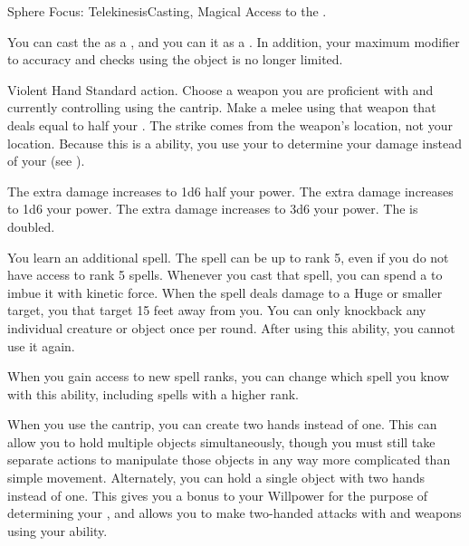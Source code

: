   \begin{magicalfeat}{Sphere Focus: Telekinesis}{Casting, Magical}
    \featpre Access to the  .

     You can cast the   as a , and you can  it as a .
    In addition, your maximum modifier to accuracy and checks using the object is no longer limited.

    \begin{magicalactiveability}{Violent Hand}
      \abilityusagetime Standard action.
      \rankline
      Choose a weapon you are proficient with and currently controlling using the  cantrip.
      Make a melee  using that weapon that deals  equal to half your .
      The strike comes from the weapon's location, not your location.
      Because this is a \magical ability, you use your  to determine your damage instead of your  (see ).

      \rankline
       The extra damage increases to 1d6 \add half your power.
       The extra damage increases to 1d6 \add your power.
       The extra damage increases to 3d6 \add your power.
       The  is doubled.
    \end{magicalactiveability}

     You learn an additional spell.
    The spell can be up to rank 5, even if you do not have access to rank 5 spells.
    Whenever you cast that spell, you can spend a  to  imbue it with kinetic force.
    When the spell deals damage to a Huge or smaller target, you  that target 15 feet away from you.
    You can only knockback any individual creature or object once per round.
    After using this ability, you  cannot use it again.

    When you gain access to new spell ranks, you can change which spell you know with this ability, including spells with a higher rank.

     When you use the  cantrip, you can create two hands instead of one.
    This can allow you to hold multiple objects simultaneously, though you must still take separate actions to manipulate those objects in any way more complicated than simple movement.
    Alternately, you can hold a single object with two hands instead of one.
    This gives you a  bonus to your Willpower for the purpose of determining your , and allows you to make two-handed attacks with  and  weapons using your  ability.
  \end{magicalfeat}

